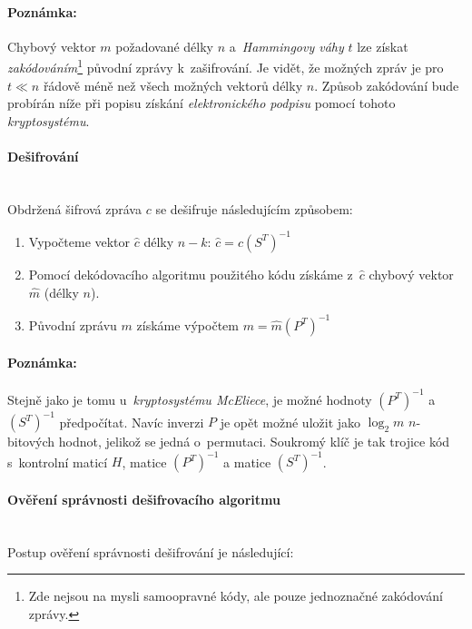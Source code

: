 \documentclass[thesis=M,czech,hidelinks]{FITthesis}[2012/06/26]
\newcommand{\0}{{\textcolor[gray]{0.75}{0}}}
\begin{document}
\paragraph{Poznámka:} Chybový vektor $m$ požadované délky $n$ a~\emph{Hammingovy
váhy} $t$ lze získat \emph{zakódováním}\footnote{
    Zde nejsou na mysli samoopravné kódy, ale pouze jednoznačné zakódování
    zprávy.
} původní zprávy k~zašifrování. Je vidět, že možných zpráv je pro $t \ll n$
řádově méně než všech možných vektorů délky $n$. Způsob zakódování bude probírán
níže při popisu získání \emph{elektronického podpisu} pomocí tohoto
\emph{kryptosystému}.


\paragraph{Dešifrování} \hfill \\
Obdržená šifrová zpráva $c$ se dešifruje následujícím způsobem:

\begin{enumerate}
    \item Vypočteme vektor $\hat{c}$ délky $n-k$:
        $\hat{c} = c \left(S^T\right)^{-1} $
    \item Pomocí dekódovacího algoritmu použitého kódu získáme z~$\hat{c}$
        chybový vektor $\hat{m}$ (délky $n$).
    \item Původní zprávu $m$ získáme výpočtem
        $m = \hat{m} \left(P^T\right)^{-1}$
\end{enumerate}


\paragraph{Poznámka:} Stejně jako je tomu u~\emph{kryptosystému McEliece}, je
možné hodnoty $\left(P^T\right)^{-1}$ a $\left(S^T\right)^{-1}$ předpočítat.
Navíc inverzi $P$ je opět možné uložit jako $\log_2 m$ $n$-bitových hodnot,
jelikož se jedná o~permutaci. Soukromý klíč je tak trojice kód s~kontrolní
maticí $H$, matice $\left(P^T\right)^{-1}$ a matice $\left(S^T\right)^{-1}$.


\paragraph{Ověření správnosti dešifrovacího algoritmu} \hfill \\
Postup ověření správnosti dešifrování je následující:
\end{document}
